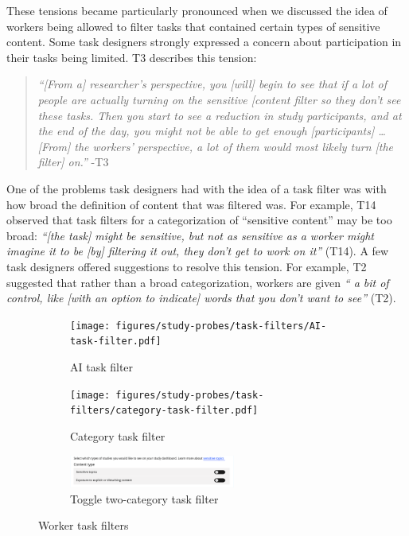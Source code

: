 These tensions became particularly pronounced when we discussed the idea of workers being allowed to filter tasks that contained certain types of sensitive content. Some task designers strongly expressed a concern about participation in their tasks being limited. T3 describes this tension:
\begin{quote}
    \textit{``[From a] researcher's perspective, you [will] begin to see that if a lot of people are actually turning on the sensitive [content filter so they don't see these tasks. Then you start to see a reduction in study participants, and at the end of the day, you might not be able to get enough [participants] \dots [From] the workers' perspective,  a lot of them would most likely turn [the filter] on.''} -T3
\end{quote} 
One of the problems task designers had with the idea of a task filter was with how broad the definition of content that was filtered was. For example, T14 observed that task filters for a categorization of ``sensitive content'' may be too broad: \textit{``[the task] might be sensitive, but not as sensitive as a worker might imagine it to be [by] filtering it out, they don't get to work on it''} (T14). A few task designers offered suggestions to resolve this tension. For example, T2 suggested that rather than a broad categorization, workers are given \textit{`` a bit of control, like [with an option to indicate] words that you don't want to see''} (T2).


\begin{figure}
    \centering
    \begin{subfigure}[b]{0.48\textwidth}
        \centering
        \texttt{[image: figures/study-probes/task-filters/AI-task-filter.pdf]} 
        \caption{AI task filter}
    \end{subfigure}
    \hfill
    \begin{subfigure}[b]{0.48\textwidth}
        \centering
        \texttt{[image: figures/study-probes/task-filters/category-task-filter.pdf]} 
        \caption{Category task filter}
    \end{subfigure}
    \vspace{1em} %
    \begin{subfigure}[b]{0.98\textwidth}
        \centering
        \includegraphics[width=0.6\textwidth]{figures/study-probes/task-filters/toggle-task-filter.pdf}
        \caption{Toggle two-category task filter}
    \end{subfigure}
    \caption{Worker task filters}
    \label{fig:worker-task-filters}
\end{figure}

